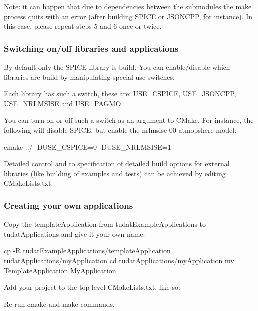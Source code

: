 Note\+: it can happen that due to dependencies between the submodules the {\ttfamily make} process quits with an error (after building S\+P\+I\+CE or J\+S\+O\+N\+C\+PP, for instance). In this case, please repeat steps 5 and 6 once or twice.

\label{_switching_apps}%
 \subsubsection*{Switching on/off libraries and applications}

By default only the S\+P\+I\+CE library is build. You can enable/disable which libraries are build by manipulating special use switches\+:


\begin{DoxyEnumerate}
\item Each library has such a switch, these are\+: {\ttfamily U\+S\+E\+\_\+\+C\+S\+P\+I\+CE}, {\ttfamily U\+S\+E\+\_\+\+J\+S\+O\+N\+C\+PP}, {\ttfamily U\+S\+E\+\_\+\+N\+R\+L\+M\+S\+I\+SE} and {\ttfamily U\+S\+E\+\_\+\+P\+A\+G\+MO}.
\item You can turn on or off such a switch as an argument to C\+Make. For instance, the following will disable S\+P\+I\+CE, but enable the nrlmsise-\/00 atmopshere model\+: \begin{DoxyVerb} cmake ../ -DUSE_CSPICE=0 -DUSE_NRLMSISE=1
\end{DoxyVerb}

\end{DoxyEnumerate}

Detailed control and to specification of detailed build options for external libraries (like building of examples and tests) can be achieved by editing {\ttfamily C\+Make\+Lists.\+txt}.

\subsubsection*{Creating your own applications}


\begin{DoxyEnumerate}
\item Copy the {\ttfamily template\+Application} from {\ttfamily tudat\+Example\+Applications} to tudat\+Applications and give it your own name\+: \begin{DoxyVerb} cp -R tudatExampleApplications/templateApplication tudatApplications/myApplication
 cd tudatApplications/myApplication
 mv TemplateApplication MyApplication
\end{DoxyVerb}

\item Add your project to the top-\/level {\ttfamily C\+Make\+Lists.\+txt}, like so\+: 

\item Re-\/run cmake and make commands.
\end{DoxyEnumerate}

